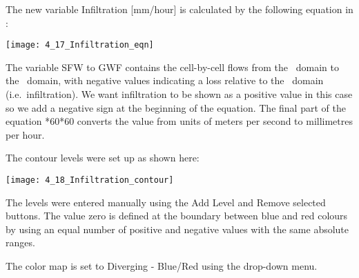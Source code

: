 The new  variable {\sf Infiltration [mm/hour]} is calculated by the following equation in \tecplot:

        \texttt{[image: 4\_17\_Infiltration\_eqn]}

The variable {\sf SFW to GWF} contains the cell-by-cell flows from the \swf\ domain to the \gwf\ domain, with negative values indicating a loss relative to the \swf\ domain (i.e.\ infiltration).  We want infiltration to be shown as a positive value in this case so we add a negative sign at the beginning of the equation.  The final part of the equation {*60*60} converts the value from units of meters per second to millimetres per hour.

The contour levels were set up as shown here:

        \texttt{[image: 4\_18\_Infiltration\_contour]}

The levels were entered manually using the {\sf Add Level} and {\sf Remove selected} buttons.  The value zero is defined at the boundary between blue and red colours by using an equal number of positive and negative values with the same absolute ranges.

The color map is set to {\sf Diverging - Blue/Red} using the drop-down menu.


